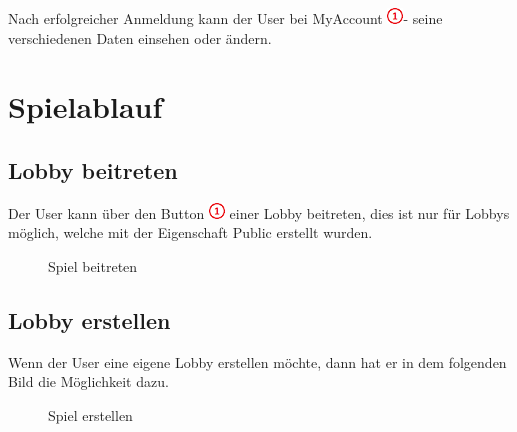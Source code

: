 \documentclass[11pt,ngerman]{article}
\begin{document}
	Nach erfolgreicher Anmeldung kann der User bei MyAccount \includegraphics{figures/1.png}- seine verschiedenen Daten einsehen oder ändern. 
    
    \section{Spielablauf}
    
    
    \subsection{Lobby beitreten}
    
    Der User kann über den Button \includegraphics{figures/1.png} einer Lobby beitreten, dies ist nur für Lobbys möglich, welche mit der Eigenschaft Public erstellt wurden.
    
    \begin{figure}[H]
    	\centering
    	\caption{Spiel beitreten}
    	\label{fig:Spiel_Beitreten}
    \end{figure}
    
    \subsection{Lobby erstellen}
    
    Wenn der User eine eigene Lobby erstellen möchte, dann hat er in dem folgenden Bild die Möglichkeit dazu.
    
	\begin{figure}[H]
		\centering
		\caption{Spiel erstellen}
		\label{fig:Spiel_Erstellen}
	\end{figure}
    
\end{document}

